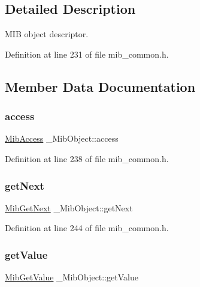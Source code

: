 \subsection{Detailed Description}
M\+IB object descriptor. 

Definition at line 231 of file mib\+\_\+common.\+h.



\subsection{Member Data Documentation}
\mbox{\label{struct__MibObject_a85b02ef43504ca1be90f74cae09df6b0}} 
\subsubsection{\texorpdfstring{access}{access}}
{\footnotesize\ttfamily \hyperlink{mib__common_8h_a801861d3d59b941b484ed18b4ea27317}{Mib\+Access} \+\_\+\+Mib\+Object\+::access}



Definition at line 238 of file mib\+\_\+common.\+h.

\mbox{\label{struct__MibObject_a78c4fe0634c680d8476066c27fa2e42a}} 
\subsubsection{\texorpdfstring{get\+Next}{getNext}}
{\footnotesize\ttfamily \hyperlink{mib__common_8h_a1bb057e88d7214de1f03dc4c8a79f64a}{Mib\+Get\+Next} \+\_\+\+Mib\+Object\+::get\+Next}



Definition at line 244 of file mib\+\_\+common.\+h.

\mbox{\label{struct__MibObject_a9b2532080795955810873fcc278335ba}} 
\subsubsection{\texorpdfstring{get\+Value}{getValue}}
{\footnotesize\ttfamily \hyperlink{mib__common_8h_ac4b16933ae43d7a37b656659c12c9bf3}{Mib\+Get\+Value} \+\_\+\+Mib\+Object\+::get\+Value}



